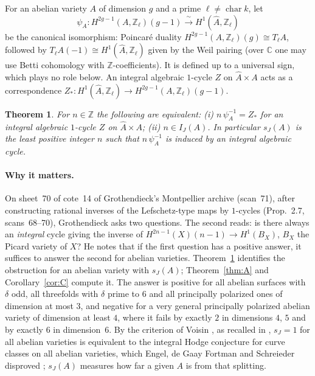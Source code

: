 \documentclass[11pt,a4paper]{article}
\newtheorem{theorem}{Theorem}
\theoremstyle{definition}
\newcommand{\Z}{\mathbb{Z}}
\newcommand{\C}{\mathbb{C}}
\renewcommand{\IJ}{I_J}
\newcommand{\sJ}{s_J}
\begin{document}
For an abelian variety $A$ of dimension $g$ and a prime $\ell\ne\operatorname{char}k$,
let
\[
\psi_A\colon H^{2g-1}(A,\Z_\ell)(g-1)\xrightarrow{\ \sim\ }H^1(\widehat A,\Z_\ell)
\]
be the canonical isomorphism: Poincar\'e duality
$H^{2g-1}(A,\Z_\ell)(g)\cong T_\ell A$, followed by
$T_\ell A(-1)\cong H^1(\widehat A,\Z_\ell)$ given by the Weil pairing
(over $\C$ one may use Betti cohomology with $\Z$-coefficients). It is
defined up to a universal sign, which plays no role below. An integral
algebraic $1$-cycle $Z$ on $\widehat A\times A$ acts as a correspondence
$Z_*\colon H^1(\widehat A,\Z_\ell)\to H^{2g-1}(A,\Z_\ell)(g-1)$.

\begin{theorem}\label{thm:D}
For $n\in\Z$ the following are equivalent: (i) $n\,\psi_A^{-1}=Z_*$ for an
integral algebraic $1$-cycle $Z$ on $\widehat A\times A$; (ii)
$n\in\IJ(A)$. In particular $\sJ(A)$ is the least positive integer $n$ such
that $n\,\psi_A^{-1}$ is induced by an integral algebraic cycle.
\end{theorem}

\paragraph{Why it matters.} On sheet~70 of cote~14 of Grothendieck's
Montpellier archive (scan~71), after constructing rational inverses of the
Lefschetz-type maps by $1$-cycles (Prop.~2.7, scans~68--70), Grothendieck
asks two questions. The second reads: is there always an \emph{integral}
cycle giving the inverse of $H^{2n-1}(X)(n-1)\to H^1(B_X)$, $B_X$ the
Picard variety of $X$? He notes that if the first question has a positive
answer, it suffices to answer the second for abelian varieties.
Theorem~\ref{thm:D} identifies the obstruction for an abelian variety with
$\sJ(A)$; Theorem~\ref{thm:A} and Corollary~\ref{cor:C} compute it. The
answer is positive for all abelian surfaces with $\delta$ odd, all
threefolds with $\delta$ prime to $6$ and all principally polarized ones of
dimension at most $3$, and negative for a very general principally
polarized abelian variety of dimension at least $4$, where it fails by
exactly $2$ in dimensions $4$, $5$ and by exactly $6$ in dimension~$6$.
By the criterion of Voisin \cite[Thm.~1.4]{Vo}, as recalled in
\cite[\S1.2]{EGFS}, $\sJ=1$ for all abelian varieties is equivalent to the
integral Hodge conjecture for curve classes on all abelian varieties, which
Engel, de Gaay Fortman and Schreieder disproved \cite{EGFS}; $\sJ(A)$
measures how far a given $A$ is from that splitting.
\end{document}
